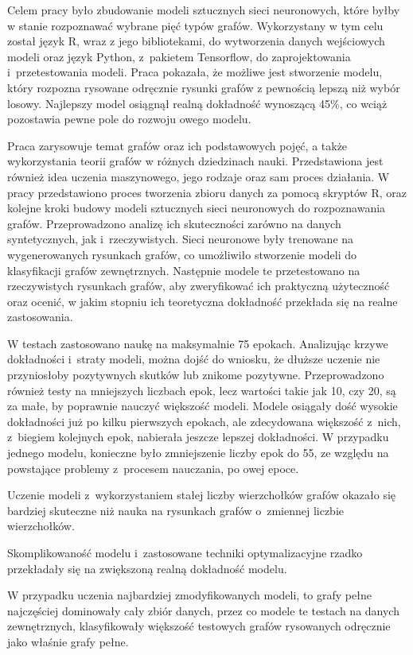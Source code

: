 Celem pracy było zbudowanie modeli sztucznych sieci neuronowych,
które byłby w stanie rozpoznawać wybrane pięć typów grafów.
Wykorzystany w tym celu został język R, wraz z jego bibliotekami, do wytworzenia danych wejściowych modeli
oraz język Python, z~pakietem Tensorflow, do zaprojektowania i~przetestowania modeli.
Praca pokazała, że możliwe jest stworzenie modelu, który rozpozna rysowane odręcznie rysunki grafów
z pewnością lepszą niż wybór losowy.
Najlepszy model osiągnął realną dokładność wynoszącą 45\%,
co wciąż pozostawia pewne pole do rozwoju owego modelu.

Praca zarysowuje temat grafów oraz ich podstawowych pojęć,
a także wykorzystania teorii grafów w różnych dziedzinach nauki.
Przedstawiona jest również idea uczenia maszynowego,
jego rodzaje oraz sam proces działania.
W pracy przedstawiono proces tworzenia zbioru danych za pomocą skryptów R,
oraz kolejne kroki budowy modeli sztucznych sieci neuronowych do rozpoznawania grafów.
Przeprowadzono analizę ich skuteczności zarówno na danych syntetycznych, jak i~rzeczywistych.
Sieci neuronowe były trenowane na wygenerowanych rysunkach grafów,
co umożliwiło stworzenie modeli do klasyfikacji grafów zewnętrznych.
Następnie modele te przetestowano na rzeczywistych rysunkach grafów,
aby zweryfikować ich praktyczną użyteczność oraz ocenić,
w jakim stopniu ich teoretyczna dokładność przekłada się na realne zastosowania.

W testach zastosowano naukę na maksymalnie 75 epokach.
Analizując krzywe dokładności i~straty modeli, można dojść do wniosku,
że dłuższe uczenie nie przyniosłoby pozytywnych skutków lub znikome pozytywne.
Przeprowadzono również testy na mniejszych liczbach epok, lecz wartości takie jak 10, czy 20,
są za małe, by poprawnie nauczyć większość modeli.
Modele osiągały dość wysokie dokładności już po kilku pierwszych epokach,
ale zdecydowana większość z~nich, z~biegiem kolejnych epok, nabierała jeszcze lepszej dokładności.
W przypadku jednego modelu, konieczne było zmniejszenie liczby epok do 55,
ze względu na powstające problemy z~procesem nauczania, po owej epoce.

Uczenie modeli z~wykorzystaniem stałej liczby wierzchołków grafów okazało się bardziej skuteczne
niż nauka na rysunkach grafów o~zmiennej liczbie wierzchołków.

Skomplikowaność modelu i~zastosowane techniki optymalizacyjne rzadko przekładały się na zwiększoną realną dokładność modelu.

W przypadku uczenia najbardziej zmodyfikowanych modeli, to grafy pełne najczęściej dominowały cały zbiór danych,
przez co modele te testach na danych zewnętrznych,
klasyfikowały większość testowych grafów rysowanych odręcznie jako właśnie grafy pełne.


